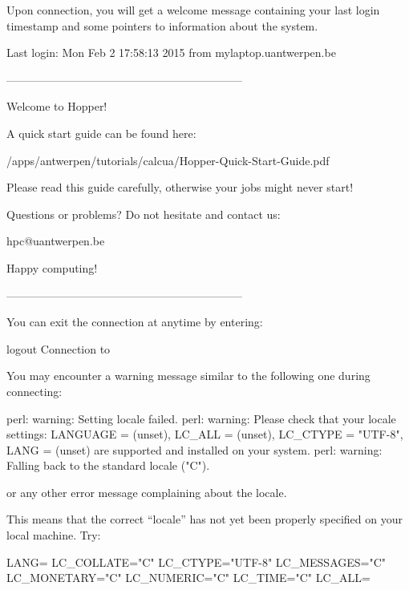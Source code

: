 \ifantwerpen
Upon connection, you will get a welcome message containing your last login
timestamp and some pointers to information about the system.

\begin{prompt}
Last login: Mon Feb  2 17:58:13 2015 from mylaptop.uantwerpen.be

---------------------------------------------------------------

Welcome to Hopper!

A quick start guide can be found here:

  /apps/antwerpen/tutorials/calcua/Hopper-Quick-Start-Guide.pdf

Please read this guide carefully, otherwise your jobs might
never start!

Questions or problems? Do not hesitate and contact us:

  hpc@uantwerpen.be

Happy computing!

---------------------------------------------------------------
\end{prompt}
\fi

You can exit the connection at anytime by entering:

\begin{prompt}
logout
Connection to %
\end{prompt}

\begin{tip}

You may encounter a warning message similar to the following one during connecting:
\begin{prompt}
perl: warning: Setting locale failed.
perl: warning: Please check that your locale settings:
LANGUAGE = (unset),
LC_ALL = (unset),
LC_CTYPE = "UTF-8",
LANG = (unset)
    are supported and installed on your system.
perl: warning: Falling back to the standard locale ("C").
\end{prompt}

or any other error message complaining about the locale.

This means that the correct ``locale'' has not yet been properly specified on
your local machine. Try:

\begin{prompt}
LANG=
LC_COLLATE="C"
LC_CTYPE="UTF-8"
LC_MESSAGES="C"
LC_MONETARY="C"
LC_NUMERIC="C"
LC_TIME="C"
LC_ALL=
\end{prompt}
\end{tip}

